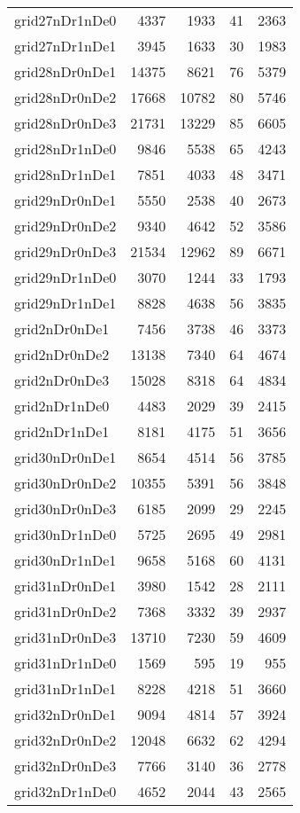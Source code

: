 \begin{longtable}{lrrrr}
grid27nDr1nDe0 & 4337 & 1933 & 41 & 2363 \\
grid27nDr1nDe1 & 3945 & 1633 & 30 & 1983 \\
grid28nDr0nDe1 & 14375 & 8621 & 76 & 5379 \\
grid28nDr0nDe2 & 17668 & 10782 & 80 & 5746 \\
grid28nDr0nDe3 & 21731 & 13229 & 85 & 6605 \\
grid28nDr1nDe0 & 9846 & 5538 & 65 & 4243 \\
grid28nDr1nDe1 & 7851 & 4033 & 48 & 3471 \\
grid29nDr0nDe1 & 5550 & 2538 & 40 & 2673 \\
grid29nDr0nDe2 & 9340 & 4642 & 52 & 3586 \\
grid29nDr0nDe3 & 21534 & 12962 & 89 & 6671 \\
grid29nDr1nDe0 & 3070 & 1244 & 33 & 1793 \\
grid29nDr1nDe1 & 8828 & 4638 & 56 & 3835 \\
grid2nDr0nDe1 & 7456 & 3738 & 46 & 3373 \\
grid2nDr0nDe2 & 13138 & 7340 & 64 & 4674 \\
grid2nDr0nDe3 & 15028 & 8318 & 64 & 4834 \\
grid2nDr1nDe0 & 4483 & 2029 & 39 & 2415 \\
grid2nDr1nDe1 & 8181 & 4175 & 51 & 3656 \\
grid30nDr0nDe1 & 8654 & 4514 & 56 & 3785 \\
grid30nDr0nDe2 & 10355 & 5391 & 56 & 3848 \\
grid30nDr0nDe3 & 6185 & 2099 & 29 & 2245 \\
grid30nDr1nDe0 & 5725 & 2695 & 49 & 2981 \\
grid30nDr1nDe1 & 9658 & 5168 & 60 & 4131 \\
grid31nDr0nDe1 & 3980 & 1542 & 28 & 2111 \\
grid31nDr0nDe2 & 7368 & 3332 & 39 & 2937 \\
grid31nDr0nDe3 & 13710 & 7230 & 59 & 4609 \\
grid31nDr1nDe0 & 1569 & 595 & 19 & 955 \\
grid31nDr1nDe1 & 8228 & 4218 & 51 & 3660 \\
grid32nDr0nDe1 & 9094 & 4814 & 57 & 3924 \\
grid32nDr0nDe2 & 12048 & 6632 & 62 & 4294 \\
grid32nDr0nDe3 & 7766 & 3140 & 36 & 2778 \\
grid32nDr1nDe0 & 4652 & 2044 & 43 & 2565 \\

\end{longtable}
